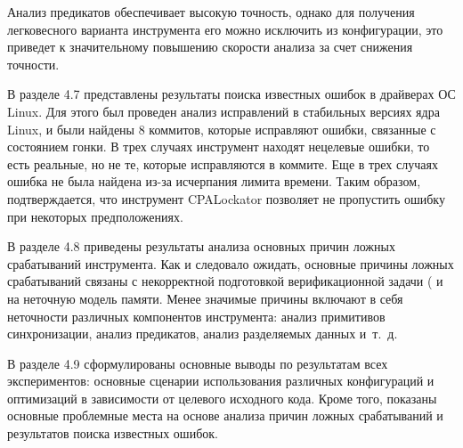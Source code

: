 Анализ предикатов обеспечивает высокую точность, однако для получения легковесного варианта инструмента его можно исключить из конфигурации, это приведет к значительному повышению скорости анализа за счет снижения точности.

В разделе 4.7 представлены результаты поиска известных ошибок в драйверах ОС Linux.
Для этого был проведен анализ исправлений в стабильных версиях ядра Linux, и были найдены 8 коммитов, которые исправляют ошибки, связанные с состоянием гонки.
В трех случаях инструмент находят нецелевые ошибки, то есть реальные, но не те, которые исправляются в коммите.
Еще в трех случаях ошибка не была найдена из-за исчерпания лимита времени.
Таким образом, подтверждается, что инструмент CPALockator позволяет не пропустить ошибку при некоторых предположениях.

В разделе 4.8 приведены результаты анализа основных причин ложных срабатываний инструмента.
Как и следовало ожидать, основные причины ложных срабатываний связаны с некорректной подготовкой верификационной задачи ( и на неточную модель памяти.
Менее значимые причины включают в себя неточности различных компонентов инструмента: анализ примитивов синхронизации, анализ предикатов, анализ разделяемых данных и~т.~д.

В разделе 4.9 сформулированы основные выводы по результатам всех экспериментов: основные сценарии использования различных конфигураций и оптимизаций в зависимости от целевого исходного кода.
Кроме того, показаны основные проблемные места на основе анализа причин ложных срабатываний и результатов поиска известных ошибок.

%

